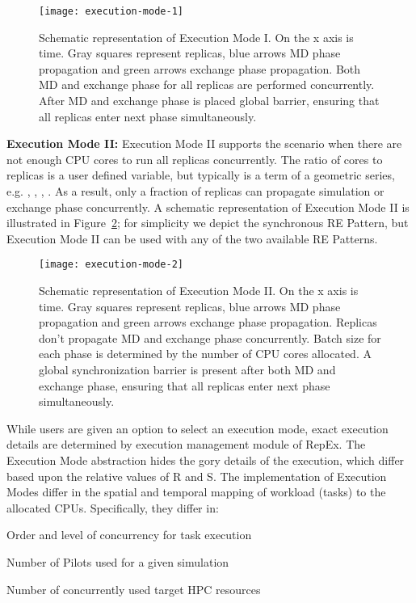 \documentclass{sig-alternate-05-2015}
\begin{document}
\begin{figure}
  \centering
  \texttt{[image: execution-mode-1]}
  \caption{\small{Schematic representation of Execution Mode I. On the x axis is time. Gray squares represent replicas, blue arrows MD phase propagation and green arrows exchange phase propagation. Both MD and exchange phase for all replicas are performed concurrently. After MD and exchange phase is placed global barrier, ensuring that all replicas enter next phase simultaneously.}}
  \label{fig:exec.mode.1}
\end{figure} 

{\bf Execution Mode II:} Execution Mode II supports the scenario when there are not enough CPU cores to run all replicas concurrently. The ratio of cores to replicas is a user defined variable, but typically is a term of a geometric series, e.g. , , , . As a result, only a fraction of replicas can propagate simulation or exchange phase concurrently. A schematic representation of Execution Mode II is illustrated in Figure~\ref{fig:exec-mode-2}; for simplicity we depict the synchronous RE Pattern, but Execution Mode II can be used with any of the two available RE Patterns.

\begin{figure}
  \centering
  \texttt{[image: execution-mode-2]}
  \caption{\small{Schematic representation of Execution Mode II. On the x axis is time. Gray squares represent replicas, blue arrows MD phase propagation and green arrows exchange phase propagation. Replicas don't propagate MD and exchange phase concurrently. Batch size for each phase is determined by the number of CPU cores allocated.  A global synchronization barrier is present after both MD and exchange phase, ensuring that all replicas enter next phase simultaneously.}}
  \label{fig:exec-mode-2}
\end{figure} 

While users are given an option to select an execution mode, exact execution details are determined by execution management module of RepEx.  The Execution Mode abstraction hides the gory details of the execution, which differ based upon the relative values of R and S. The implementation of Execution Modes differ in the spatial and temporal mapping of workload (tasks) to the allocated CPUs. Specifically, they differ in: 
\begin{compactitem}
  \item Order and level of concurrency for task execution 
  \item Number of Pilots used for a given simulation
  \item Number of concurrently used target HPC resources
\end{compactitem}
 
\end{document}
